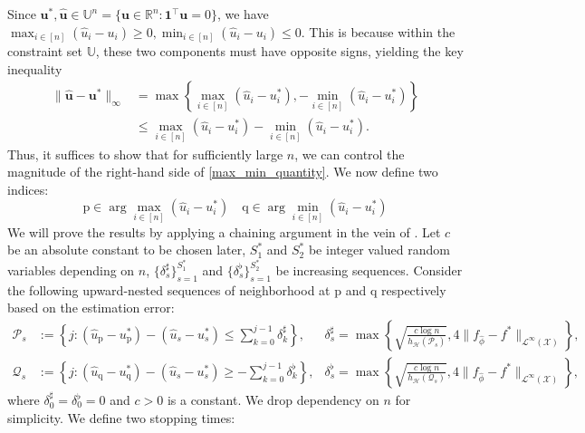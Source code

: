 \documentclass[
  12pt]{article}
\begin{document}
Since $\boldsymbol{u}^*,\widehat{\boldsymbol{u}}\in\mathbb{U}^n= \{ \boldsymbol{u}\in \mathbb{R}^n: \mathbf{1}^{\top} \boldsymbol{u}=0\}$, we have $\max _{i \in[n]}\left(\widehat{u}_i-u_i\right) \geq 0, \min _{i \in[n]}\left(\widehat{u}_i-u_i\right) \leq 0$. This is because within the constraint set $\mathbb{U}$, these two components must have opposite signs, yielding the key inequality
\begin{align}\|\widehat{\boldsymbol{u}}-\boldsymbol{u}^*\|_{\infty}&=\max \left\{\max _{i \in[n]}\left(\widehat{u}_i-u^*_i\right),-\min _{i \in[n]}\left(\widehat{u}_i-u^*_i\right)\right\}\nonumber\\ &\leq \max _{i \in[n]}\left(\widehat{u}_i-u^*_i\right)-\min _{i \in[n]}\left(\widehat{u}_i-u^*_i\right).\label{max_min_quantity}
\end{align}
\noindent Thus, it suffices to show that for sufficiently large $n$, we can control the magnitude of the right-hand side of \eqref{max_min_quantity}. We now define two indices:
$$\mathrm{p} \in \arg \max _{i \in[n]}\left(\widehat{u}_i-u^*_i\right) \quad \mathrm{q} \in \arg \min _{i \in[n]}\left(\widehat{u}_i-u^*_i\right)$$
We will prove the results by applying a chaining argument in the vein of \cite{han2025unifiedanalysis}. Let $c$ be an absolute constant to be chosen later, $S_1^*$ and $S_2^*$ be integer valued random variables depending on $n$, $\{\delta^\sharp_s\}_{s=1}^{S_1^*}$ and $\{\delta^\flat_s\}_{s=1}^{S_2^*}$ be increasing sequences. Consider the following upward-nested sequences of neighborhood at $\mathrm{p}$ and $\mathrm{q}$ respectively based on the estimation error:
{\small\begin{align}
\mathcal{P}_s&:=\left\{j:\left(\widehat{u}_\mathrm{p}-u^*_\mathrm{p}\right)-\left(\widehat{u}_s-u^*_s\right) \leq \sum_{k=0}^{j-1}\delta^\sharp_{k}\right\},  & \delta^\sharp_s= \max\left\{\sqrt{\frac{c \log n}{h_{\mathcal{H}}(\mathcal{P}_s)}}, 4\|f_{\widehat{\phi}}-f^*\|_{\mathcal{L}^\infty(\mathcal{X})}\right\}, \label{construction}\\
\mathcal{Q}_s&:=\left\{j:\left(\widehat{u}_\mathrm{q}-u^*_\mathrm{q}\right)-\left(\widehat{u}_s-u^*_s\right) \geq-\sum_{k=0}^{j-1} \delta^\flat_{k}\right\}, & \delta^\flat_s= \max\left\{\sqrt{\frac{c \log n}{h_{\mathcal{H}}(\mathcal{Q}_s)}}, 4\|f_{\widehat{\phi}}-f^*\|_{\mathcal{L}^\infty(\mathcal{X})}\right\}, \nonumber
\end{align}}
\noindent where $\delta^\sharp_0=\delta^\flat_0=0$ and $c>0$ is a constant. We drop dependency on $n$ for simplicity. We define two stopping times:
\end{document}
